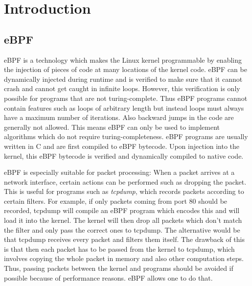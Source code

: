 \documentclass[conference]{IEEEtran}
\begin{document}

\maketitle

\section{Introduction}

\subsection{eBPF}

eBPF \cite{noauthor_ebpf_2020} is a technology which makes the Linux kernel programmable by enabling the injection of pieces of code at many locations of the kernel code. eBPF can be dynamically injected during runtime and is verified to make sure that it cannot crash and cannot get caught in infinite loops. However, this verification is only possible for programs that are not turing-complete. Thus eBPF programs cannot contain features such as loops of arbitrary length but instead loops must always have a maximum number of iterations. Also backward jumps in the code are generally not allowed. This means eBPF can only be used to implement algorithms which do not require turing-completeness. eBPF programs are usually written in C and are first compiled to eBPF bytecode. Upon injection into the kernel, this eBPF bytecode is verified and dynamically compiled to native code. 

eBPF is especially suitable for packet processing: When a packet arrives at a network interface, certain actions can be performed such as dropping the packet. This is useful for programs such as \textit{tcpdump}, which records packets according to certain filters. For example, if only packets coming from port 80 should be recorded, tcpdump will compile an eBPF program which encodes this and will load it into the kernel. The kernel will then drop all packets which don't match the filter and only pass the correct ones to tcpdump. The alternative would be that tcpdump receives every packet and filters them itself. The drawback of this is that then each packet has to be passed from the kernel to tcpdump, which involves copying the whole packet in memory and also other computation steps. Thus, passing packets between the kernel and programs should be avoided if possible because of performance reasons. eBPF allows one to do that. 
\end{document}
